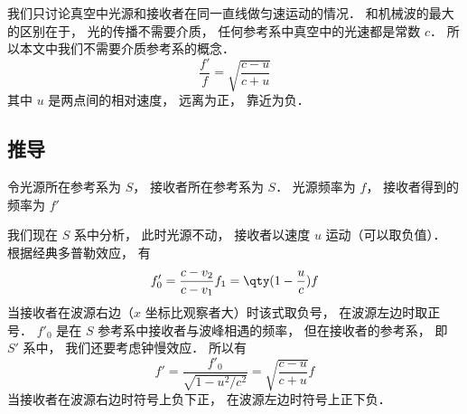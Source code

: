 

我们只讨论真空中光源和接收者在同一直线做匀速运动的情况． 和机械波的最大的区别在于， 光的传播不需要介质， 任何参考系中真空中的光速都是常数 $c$． %
所以本文中我们不需要介质参考系的概念．
\begin{equation}
\frac{f'}{f} = \sqrt{\frac{c - u}{c + u}}
\end{equation}
其中 $u$ 是两点间的相对速度， 远离为正， 靠近为负．

\subsection{推导}
令光源所在参考系为 $S$， 接收者所在参考系为 $S$． 光源频率为 $f$， 接收者得到的频率为 $f'$

我们现在 $S$ 系中分析， 此时光源不动， 接收者以速度 $u$ 运动（可以取负值）． 根据经典多普勒效应， 有
\begin{equation}
f'_0 = \frac{c - v_2}{c - v_1}f_1 = \qty(1 - \frac{u}{c})f
\end{equation}
当接收者在波源右边（$x$ 坐标比观察者大）时该式取负号， 在波源左边时取正号． $f'_0$ 是在 $S$ 参考系中接收者与波峰相遇的频率， 但在接收者的参考系， 即 $S'$ 系中， 我们还要考虑钟慢效应． 所以有
\begin{equation}
f' = \frac{f'_0}{\sqrt{1 - u^2/c^2}} = \sqrt{\frac{c - u}{c + u}} f
\end{equation}
当接收者在波源右边时符号上负下正， 在波源左边时符号上正下负．
